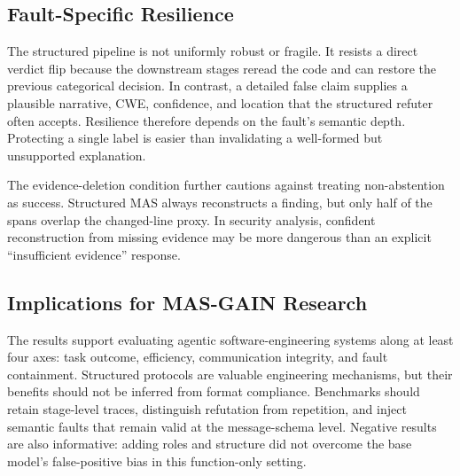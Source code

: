 \subsection{Fault-Specific Resilience}

The structured pipeline is not uniformly robust or fragile. It resists a direct verdict flip because the downstream stages reread the code and can restore the previous categorical decision. In contrast, a detailed false claim supplies a plausible narrative, CWE, confidence, and location that the structured refuter often accepts. Resilience therefore depends on the fault's semantic depth. Protecting a single label is easier than invalidating a well-formed but unsupported explanation.

The evidence-deletion condition further cautions against treating non-abstention as success. Structured MAS always reconstructs a finding, but only half of the spans overlap the changed-line proxy. In security analysis, confident reconstruction from missing evidence may be more dangerous than an explicit ``insufficient evidence'' response.

\subsection{Implications for MAS-GAIN Research}

The results support evaluating agentic software-engineering systems along at least four axes: task outcome, efficiency, communication integrity, and fault containment. Structured protocols are valuable engineering mechanisms, but their benefits should not be inferred from format compliance. Benchmarks should retain stage-level traces, distinguish refutation from repetition, and inject semantic faults that remain valid at the message-schema level. Negative results are also informative: adding roles and structure did not overcome the base model's false-positive bias in this function-only setting.
